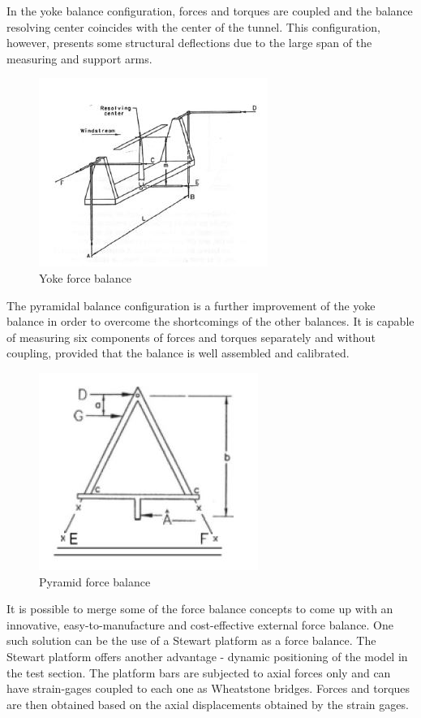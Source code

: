 In the yoke balance configuration, forces and torques are coupled and the balance resolving center coincides with the center of the tunnel. This configuration, however, presents some structural deflections due to the large span of the measuring and support arms.
\begin{center}
	\begin{figure}[H]
		\centering
		\includegraphics{Figures/Yoke}
		\caption[Yoke force balance]{Yoke force balance \cite{ferreira2015design}}
	\end{figure}
\end{center}
The pyramidal balance configuration is a further improvement of the yoke balance in order to overcome the shortcomings of the other balances. It is capable of measuring six components of forces and
torques separately and without coupling, provided that the balance is well assembled and calibrated.
\begin{center}
	\begin{figure}[H]
		\centering
		\includegraphics{Figures/Pyramid}
		\caption[Pyramid force balance]{Pyramid force balance \cite{ferreira2015design}}
	\end{figure}
\end{center}
It is possible to merge some of the force balance concepts to come up with an innovative, easy-to-manufacture and cost-effective external force balance. One such solution can be the use of a Stewart platform as a force balance. The Stewart platform offers another advantage - dynamic positioning of the model in the test section.
The platform bars are subjected to axial forces only and can have strain-gages coupled to each one as Wheatstone bridges. Forces and torques are then obtained based on the axial displacements obtained by the strain gages\cite{fernandes_design_nodate}.

